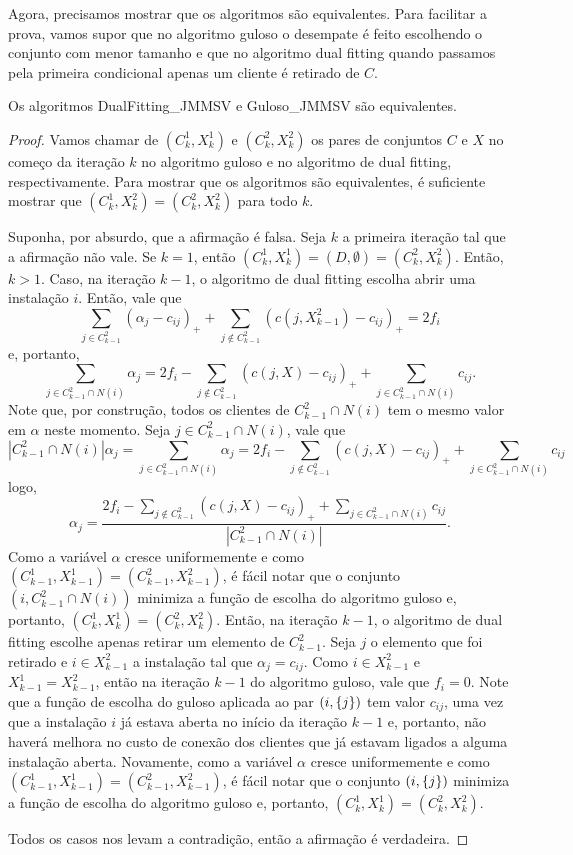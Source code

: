 Agora, precisamos mostrar que os algoritmos são equivalentes. Para facilitar a prova, vamos supor que no algoritmo guloso o desempate é feito escolhendo o conjunto com menor tamanho e que no algoritmo dual fitting quando passamos pela primeira condicional apenas um cliente é retirado de $C$.

\begin{theorem}
Os algoritmos {\sc DualFitting\_JMMSV} e {\sc Guloso\_JMMSV} são equivalentes.
\end{theorem}

\begin{proof}
Vamos chamar de $(C_k^1,X_k^1)$ e $(C_k^2,X_k^2)$ os pares de conjuntos $C$ e $X$ no começo da iteração $k$ no algoritmo guloso e no algoritmo de dual fitting, respectivamente. Para mostrar que os algoritmos são equivalentes, é suficiente mostrar que $(C_k^1,X_k^2) = (C_k^2,X_k^2)$ para todo $k$.

Suponha, por absurdo, que a afirmação é falsa. Seja $k$ a primeira iteração tal que a afirmação não vale. Se $k=1$, então $(C_k^1,X_k^1) = (D,\emptyset) = (C_k^2,X_k^2)$.
Então, $k>1$.
Caso, na iteração $k-1$, o algoritmo de dual fitting escolha abrir uma instalação $i$. Então, vale que 
\[
    \sum_{j \in C_{k-1}^2} (\alpha_j - c_{ij})_+ + \sum_{j \not \in C_{k-1}^2}(c(j,X_{k-1}^2) - c_{ij})_+ = 2f_i
\] 
e, portanto,
\[
    \sum_{j \in C_{k-1}^2 \cap N(i)} \alpha_j = 2f_i - \sum_{j \not \in C_{k-1}^2} (c(j,X)- c_{ij})_+  + \sum_{j \in  C_{k-1}^2 \cap N(i)} c_{ij}. 
\]
Note que, por construção, todos os clientes de  $C_{k-1}^2 \cap N(i)$ tem o mesmo valor em $\alpha$ neste momento. Seja $j \in C_{k-1}^2 \cap N(i)$, vale que
\[
    |C_{k-1}^2 \cap N(i)| \alpha_j = \sum_{j \in C_{k-1}^2 \cap N(i)} \alpha_j = 2f_i - \sum_{j \not \in C_{k-1}^2} (c(j,X)- c_{ij})_+  + \sum_{j \in  C_{k-1}^2 \cap N(i)} c_{ij}
\]
logo, 
\[
    \alpha_j = \frac{ 2f_i - \sum_{j \not \in C_{k-1}^2} (c(j,X)- c_{ij})_+  + \sum_{j \in  C_{k-1}^2 \cap N(i)} c_{ij}}{|C_{k-1}^2 \cap N(i)|}.
\]
Como a variável $\alpha$ cresce uniformemente e como $(C_{k-1}^1,X_{k-1}^1) = (C_{k-1}^2,X_{k-1}^2)$, é fácil notar que o conjunto $(i,C_{k-1}^2 \cap N(i))$ minimiza a função de escolha do algoritmo guloso e, portanto, $(C_{k}^1,X_{k}^1) = (C_{k}^2,X_{k}^2)$. Então, na iteração $k-1$, o algoritmo de dual fitting escolhe apenas retirar um elemento de $C_{k-1}^2$. Seja $j$ o elemento que foi retirado e $i \in X_{k-1}^2$ a instalação tal que $\alpha_j = c_{ij}$. Como $i \in X_{k-1}^2$ e $X_{k-1}^1 = X_{k-1}^2$, então na iteração $k-1$ do algoritmo guloso, vale que $f_i = 0$. Note que a função de escolha do guloso aplicada ao par $(i,\{j\})$ tem valor $c_{ij}$, uma vez que a instalação $i$ já estava aberta no início da iteração $k-1$ e, portanto, não haverá melhora no custo de conexão dos clientes que já estavam ligados a alguma instalação aberta. Novamente, como a variável $\alpha$ cresce uniformemente e como $(C_{k-1}^1,X_{k-1}^1) = (C_{k-1}^2,X_{k-1}^2)$, é fácil notar que o conjunto $(i,\{j\})$ minimiza a função de escolha do algoritmo guloso e, portanto, $(C_{k}^1,X_{k}^1) = (C_{k}^2,X_{k}^2)$.

Todos os casos nos levam a contradição, então a afirmação é verdadeira.   
\end{proof}